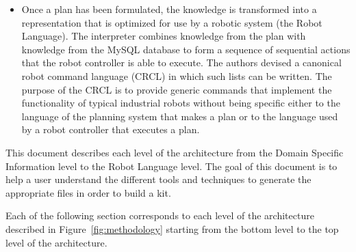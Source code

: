 \begin{itemize}
\item Once a plan has been formulated, the knowledge is transformed into a
representation that is optimized for use by a robotic system (the Robot
Language). The interpreter combines knowledge from the plan with knowledge
from the MySQL database to form a sequence of sequential actions that the
robot controller is able to execute. The authors devised a canonical robot
command language (CRCL) in which such lists can be written. The purpose of
the CRCL is to provide generic commands that implement the functionality of
typical industrial robots without being specific either to the language of
the planning system that makes a plan or to the language used by a robot
controller that executes a plan.
\end{itemize}

This document describes each level of the architecture from the Domain Specific Information level to the Robot Language level. The goal of this document is to help a user understand the different tools and techniques to generate the appropriate files in order to build a kit.

Each of the following section corresponds to each level of the architecture described in Figure~\ref{fig:methodology} starting from the bottom level to the top level of the architecture. 